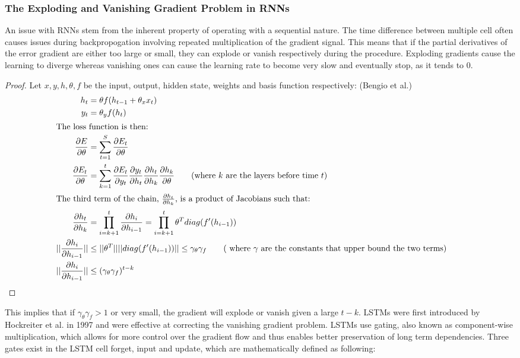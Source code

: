 \documentclass[10pt,onecolumn,letterpaper]{article}
\begin{document}
\subsubsection{The Exploding and Vanishing Gradient Problem in RNNs}

An issue with RNNs stem from the inherent property of operating with a sequential nature. The time difference between multiple cell often causes issues during backpropogation involving repeated multiplication of the gradient signal. This means that if the partial derivatives of the error gradient are either too large or small, they can explode or vanish respectively during the procedure. Exploding gradients cause the learning to diverge whereas vanishing ones can cause the learning rate to become very slow and eventually stop, as it tends to 0.
\vskip -1cm
\begin{proof}\renewcommand{\qedsymbol}{}
Let $x, y, h,  \theta, f $ be the input, output, hidden state, weights and basis function respectively: (Bengio et al.)
	\begin{align*}
    	h_{t} &=  \theta f(h_{t-1}+\theta_{x}x_{t})\\
    	y_{t} &= \theta_{y} f(h_{t}) \\
    	\shortintertext{The loss function is then:} 
    	\frac{\partial E}{\partial \theta} &= \sum_{t=1}^{S} \frac{\partial E_{t}}{\partial \theta} \\
  	\frac{\partial E_{t}}{\partial \theta} &= \sum_{k=1}^{t} \frac{\partial E_{t}}{\partial y_{t}} \frac{\partial  y_{t}}{\partial h_{t}} \frac{\partial h_{t}}{\partial h_{k}} \frac{\partial h_{k}}{\partial \theta} \tag{where $k$ are the layers before time $t$} \\
	\shortintertext{The third term of the chain, $\frac{\partial h_{t}}{\partial h_{k}}$, is a product of Jacobians such that:} 
	\frac{\partial h_{t}}{\partial h_{k}} &= \prod_{i = k+1}^{t} \frac{\partial h_{i}}{\partial h_{i-1}} = \prod_{i = k+1}^{t} \theta^{T}  diag(f'(h_{i-1})) \\
	||\frac{\partial h_{i}}{\partial h_{i-1}}|| & \leq ||\theta^{T}|| ||diag(f'(h_{i-1}))|| \leq \gamma_{\theta}\gamma_{f} \tag{ where $\gamma$ are the constants that upper bound the two terms} \\
	||\frac{\partial h_{i}}{\partial h_{i-1}}|| & \leq  (\gamma_{\theta}\gamma_{f})^{t-k} &&\qedhere \\
 	\end{align*}
\end{proof}
\vskip -0.5cm
This implies that if $\gamma_{\theta}\gamma_{f} > 1$ or very small, the gradient will explode or vanish given a large $t-k$. LSTMs were first introduced by Hockreiter et al.\cite{Hockreiter} in 1997 and were effective at correcting the vanishing gradient problem. LSTMs use gating, also known as component-wise multiplication, which allows for more control over the gradient flow and thus enables better preservation of long term dependencies. Three gates exist in the LSTM cell forget, input and update, which are mathematically defined as following: 
\end{document}

